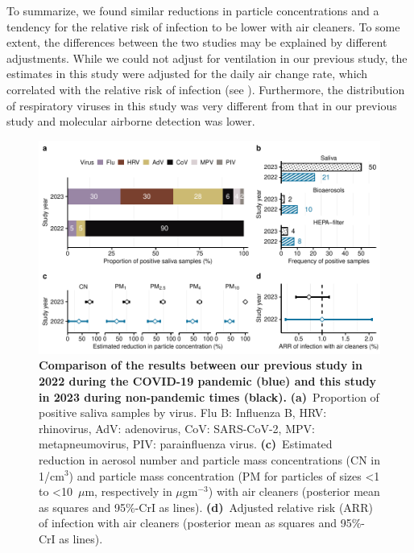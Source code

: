 \documentclass[fleqn,11pt]{wlscirep}
\begin{document}

To summarize, we found similar reductions in particle concentrations and a tendency for the relative risk of infection to be lower with air cleaners. To some extent, the differences between the two studies may be explained by different adjustments. While we could not adjust for ventilation in our previous study, the estimates in this study were adjusted for the daily air change rate, which correlated with the relative risk of infection (see ). Furthermore, the distribution of respiratory viruses in this study was very different from that in our previous study and molecular airborne detection was lower.

\begin{figure}[!htpb]
    \includegraphics[width=\linewidth]{../../results/comparison.pdf} 
    \caption{\textbf{Comparison of the results between our previous study in 2022 during the COVID-19 pandemic (blue) and this study in 2023 during non-pandemic times (black).} \textbf{(a)}~Proportion of positive saliva samples by virus. Flu B: Influenza B, HRV: rhinovirus, AdV: adenovirus, CoV: SARS-CoV-2, MPV: metapneumovirus, PIV: parainfluenza virus. \textbf{(c)}~Estimated reduction in aerosol number and particle mass concentrations (CN in 1/cm$^3$) and particle mass concentration (PM for particles of sizes <1 to <10~$\mu$m, respectively in $\mu$gm$^{-3}$) with air cleaners (posterior mean as squares and 95\%-CrI as lines). \textbf{(d)}~Adjusted relative risk (ARR) of infection with air cleaners (posterior mean as squares and 95\%-CrI as lines).}
    \label{fig:comparison}
\end{figure}

\end{document}
